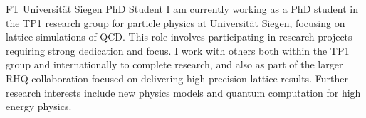\documentclass[10pt]{article} %
\begin{document}
\begin{paracol}{2}
{FT}
{Universit\"{a}t Siegen}
{PhD Student}
{I am currently working as a PhD student in the TP1 research group for particle physics at Universit\"{a}t Siegen, focusing on lattice simulations of QCD. This role involves participating in research projects requiring strong dedication and focus. I work with others both within the TP1 group and internationally to complete research, and also as part of the larger RHQ collaboration focused on delivering high precision lattice results. Further research interests include new physics models and quantum computation for high energy physics.}
%
%
%
%



\end{paracol}
\end{document}
